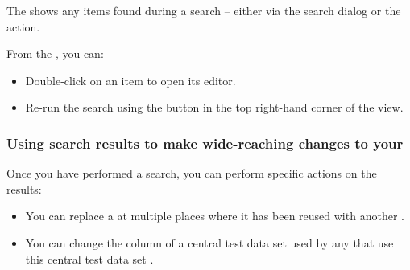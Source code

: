 The \gdsearchresultview{} shows any items found during a search -- either via the search dialog or the  action.

From the \gdsearchresultview{}, you can:

\begin{itemize}
\item Double-click on an item to open its editor. 
\item Re-run the search using the button in the top right-hand corner of the view. 
\end{itemize}

\subsubsection{Using search results to make wide-reaching changes to your \gdproject{}}
\label{TasksSearchResultActions}

Once you have performed a search, you can perform specific actions on the results:
\begin{itemize}
\item You can replace a \gdcase{} at multiple places where it has been reused with another \gdcase{} .
\item You can change the column of a central test data set used by any \gdcases{} that use this central test data set .
\end{itemize}

